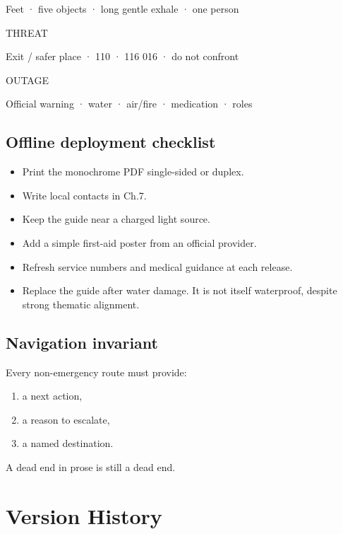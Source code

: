 Feet · five objects · long gentle exhale · one person

THREAT

Exit / safer place · 110 · 116 016 · do not confront

OUTAGE

Official warning · water · air/fire · medication · roles

\hypertarget{offline-deployment-checklist}{%
\subsection{Offline deployment
checklist}\label{offline-deployment-checklist}}

\begin{itemize}
\tightlist
\item
  Print the monochrome PDF single-sided or duplex.
\item
  Write local contacts in Ch.7.
\item
  Keep the guide near a charged light source.
\item
  Add a simple first-aid poster from an official provider.
\item
  Refresh service numbers and medical guidance at each release.
\item
  Replace the guide after water damage. It is not itself waterproof,
  despite strong thematic alignment.
\end{itemize}

\hypertarget{navigation-invariant}{%
\subsection{Navigation invariant}\label{navigation-invariant}}

Every non-emergency route must provide:

\begin{enumerate}
\def\labelenumi{\arabic{enumi}.}
\tightlist
\item
  a next action,
\item
  a reason to escalate,
\item
  a named destination.
\end{enumerate}

A dead end in prose is still a dead end.

\hypertarget{09-version-history}{}
\hypertarget{version-history}{%
\section{Version History}\label{version-history}}

